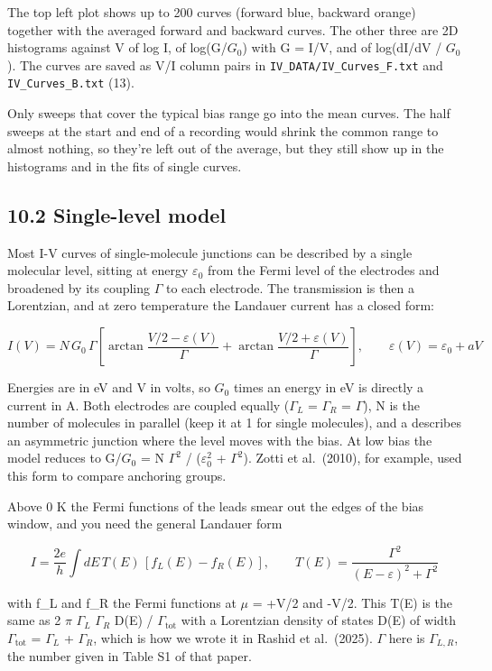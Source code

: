 \documentclass[
  11pt,
  a4paper,
]{article}
\begin{document}
The top left plot shows up to 200 curves (forward blue, backward orange)
together with the averaged forward and backward curves. The other three
are 2D histograms against V of log I, of log(G/$G_0$) with G = I/V, and
of log(dI/dV / $G_0$). The curves are saved as V/I column pairs in
\texttt{IV\_\allowbreak{}DATA/\allowbreak{}IV\_\allowbreak{}Curves\_\allowbreak{}F.txt}
and \texttt{IV\_\allowbreak{}Curves\_\allowbreak{}B.txt} (13).

Only sweeps that cover the typical bias range go into the mean curves.
The half sweeps at the start and end of a recording would shrink the
common range to almost nothing, so they're left out of the average, but
they still show up in the histograms and in the fits of single curves.

\hypertarget{single-level-model}{%
\subsection{10.2 Single-level model}\label{single-level-model}}

Most I-V curves of single-molecule junctions can be described by a
single molecular level, sitting at energy $\varepsilon_0$ from the Fermi
level of the electrodes and broadened by its coupling $\Gamma$ to each
electrode. The transmission is then a Lorentzian, and at zero
temperature the Landauer current has a closed form:

\[
I(V) = N\,G_0\,\Gamma \left[\arctan\frac{V/2 - \varepsilon(V)}{\Gamma} + \arctan\frac{V/2 + \varepsilon(V)}{\Gamma}\right], \qquad \varepsilon(V) = \varepsilon_0 + a V
\]

Energies are in eV and V in volts, so $G_0$ times an energy in eV is
directly a current in A. Both electrodes are coupled equally ($\Gamma_L$
= $\Gamma_R$ = $\Gamma$), N is the number of molecules in parallel (keep
it at 1 for single molecules), and a describes an asymmetric junction
where the level moves with the bias. At low bias the model reduces to
G/$G_0$ = N $\Gamma^2$ / ($\varepsilon_0^2$ + $\Gamma^2$). Zotti et
al.~(2010), for example, used this form to compare anchoring groups.

Above 0 K the Fermi functions of the leads smear out the edges of the
bias window, and you need the general Landauer form

\[
I = \frac{2e}{h}\int dE\, T(E)\,[f_L(E) - f_R(E)], \qquad T(E) = \frac{\Gamma^2}{(E - \varepsilon)^2 + \Gamma^2}
\]

with f\_L and f\_R the Fermi functions at $\mu$ = +V/2 and -V/2. This
T(E) is the same as 2 $\pi$ $\Gamma_L$ $\Gamma_R$ D(E) /
$\Gamma_\mathrm{tot}$ with a Lorentzian density of states D(E) of width
$\Gamma_\mathrm{tot}$ = $\Gamma_L$ + $\Gamma_R$, which is how we wrote
it in Rashid et al.~(2025). $\Gamma$ here is $\Gamma_{L,R}$, the number
given in Table S1 of that paper.
\end{document}
